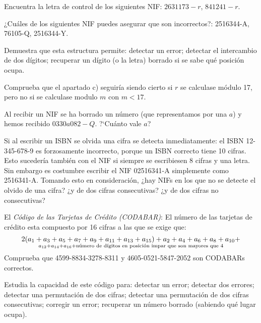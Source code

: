 \begin{problem}[3]
\begin{center}
\end{center}
\normalsize
\ppart Encuentra la letra de control de los siguientes NIF:
$2631173-r$, $841241-r$.

\ppart ¿Cuáles de los siguientes NIF puedes asegurar que son
incorrectos?: 2516344-A, 76105-Q, 2516344-Y.

\ppart Demuestra que esta estructura permite: detectar un error;
detectar el intercambio de dos dígitos; recuperar un dígito (o la
letra) borrado si se sabe qué posición ocupa.

\ppart Comprueba que el apartado c) seguiría siendo cierto si $r$ se
calculase módulo 17, pero no si se calculase modulo $m$ con
$m<17$.

\ppart Al recibir un NIF se ha borrado un número (que representamos
por una $a$) y hemos recibido $0330a082-Q$. ?`Cuánto vale $a$?
\solution
\end{problem}

\begin{problem}[4]
 Si al escribir un ISBN se olvida una cifra se detecta
inmediatamente: el ISBN 12-345-678-9 es forzosamente incorrecto,
porque un ISBN correcto tiene 10 cifras. Esto sucedería también
con el NIF si siempre se escribiesen 8 cifras y una letra. Sin
embargo es costumbre escribir el NIF 02516341-A simplemente como
2516341-A. Tomando esto en consideración, ¿hay NIFs en los que no
se detecte el olvido de una cifra? ¿y de dos cifras consecutivas?
¿y de dos cifras no consecutivas?
\solution
\end{problem}

\begin{problem}[5] El {\it Código de las Tarjetas de Crédito (CODABAR)}: El
número de las tarjetas de crédito esta compuesto por 16 cifras a
las que se exige que:
\small
\[2(a_1+a_3+a_5+a_7+a_9+a_{11}+a_{13}+a_{15})
+a_2+a_4+a_6+a_8+a_{10}+\atop a_{12}+a_{14}+a_{16}+
\text{número de dígitos en posición impar que son mayores que
4}\]
\normalsize
\ppart Comprueba que 4599-8834-3278-8311 y 4605-0521-5847-2052 son
CODABARs correctos.

\ppart Estudia la capacidad de este código para: detectar un error;
detectar dos errores; detectar una permutación de dos cifras;
detectar una permutación de dos cifras consecutivas; corregir un
error; recuperar un número borrado (sabiendo qué lugar ocupa).
\solution
\end{problem}

